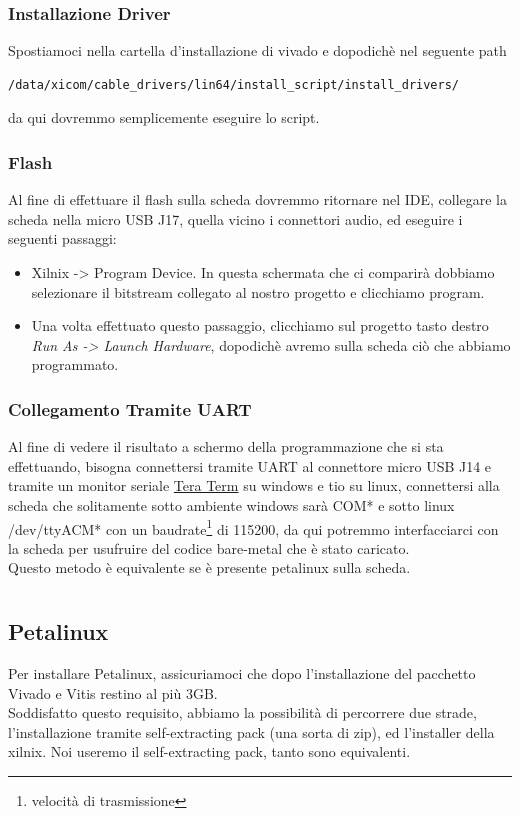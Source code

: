 \subsection{Installazione Driver}
Spostiamoci nella cartella d'installazione di vivado e dopodichè nel seguente path
\begin{lstlisting}
/data/xicom/cable_drivers/lin64/install_script/install_drivers/
\end{lstlisting}
da qui dovremmo semplicemente eseguire lo script.
\subsection{Flash}
Al fine di effettuare il flash sulla scheda dovremmo ritornare nel IDE, collegare la scheda nella micro USB J17, quella vicino i connettori audio, ed eseguire i seguenti passaggi:
\begin{itemize}
    \item Xilnix -> Program Device. In questa schermata che ci comparirà dobbiamo selezionare il bitstream collegato al nostro progetto e clicchiamo program.
    \item Una volta effettuato questo passaggio, clicchiamo sul progetto tasto destro \textit{Run As -> Launch Hardware}, dopodichè avremo sulla scheda ciò che abbiamo programmato.
\end{itemize}
\subsection{Collegamento Tramite UART}
Al fine di vedere il risultato a schermo della programmazione che si sta effettuando, bisogna connettersi tramite UART al connettore micro USB J14 e tramite un monitor seriale \href{https://ttssh2.osdn.jp/index.html.en}{Tera Term} su windows e tio su linux, connettersi alla scheda che solitamente sotto ambiente windows sarà COM* e sotto linux /dev/ttyACM* con un baudrate\footnote{velocità di trasmissione} di 115200, da qui potremmo interfacciarci con la scheda per usufruire del codice bare-metal che è stato caricato. \\
Questo metodo è equivalente se è presente petalinux sulla scheda.



\chapter{}

\section{Petalinux}
\label{petalinuxinst}
Per installare Petalinux, assicuriamoci che dopo l'installazione del pacchetto Vivado e Vitis restino al più 3GB.\\
Soddisfatto questo requisito, abbiamo la possibilità di percorrere due strade, l'installazione tramite self-extracting pack (una sorta di zip), ed l'installer della xilnix. Noi useremo il self-extracting pack, tanto sono equivalenti.\\
